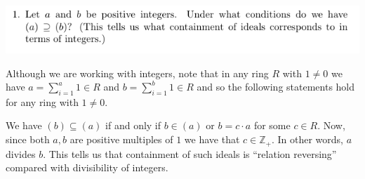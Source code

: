 \documentclass[12pt,letterpaper,boxed]{hmcpset}
\newcommand{\Z}{\mathbb Z}
\begin{document}


\begin{problem}
	\includegraphics[scale=0.8]{1.png}
	\hfill
\end{problem}

\begin{solution}
Although we are working with integers, note that in any ring $R$ with
$1\neq 0$ we have $a = \sum_{i=1}^a 1 \in R$ and $b = \sum_{i=1}^b 1
\in R$ and so the following statements hold for any ring with $1 \neq
0$. 

We have $(b) \subseteq (a)$ if and only if $b \in (a)$ or $b = c\cdot
a$ for some $c \in R$. Now, since both $a,b$ are positive multiples of $1$ we
have that $c \in \Z_+$. In other words, $a$ divides $b$. This tells us
that containment of such ideals is ``relation reversing'' compared with
divisibility of integers.
\end{solution}

\newpage


\begin{problem}[2]
	\hfill
\end{problem}

\begin{solution}
\end{solution}

\newpage

\end{document}
